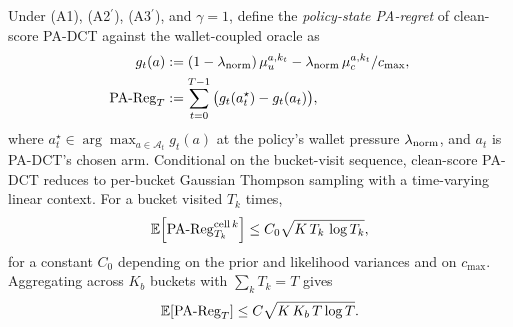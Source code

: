 \begin{theorem}
\label{thm:stationary-regret}
Under (A1), (A2$^\prime$), (A3$^\prime$), and $\gamma=1$, define the
\emph{policy-state PA-regret} of clean-score PA-DCT against the wallet-coupled
oracle as
\begin{equation}
\label{eq:policy-state-regret}
\begin{aligned}
g_t(a) &:=
(1-\lambda_{\mathrm{norm}})\,\mu_u^{a,k_t}
- \lambda_{\mathrm{norm}}\,\mu_c^{a,k_t}/c_{\max},\\
\mathrm{PA\text{-}Reg}_T &:= \sum_{t=0}^{T-1}\big(g_t(a^\star_t)-g_t(a_t)\big),
\end{aligned}
\end{equation}
where $a^\star_t\in\arg\max_{a\in\mathcal{A}_t}g_t(a)$ at the policy's wallet
pressure $\lambda_{\mathrm{norm}}$, and $a_t$ is PA-DCT's chosen arm. Conditional on the
bucket-visit sequence, clean-score PA-DCT reduces to per-bucket Gaussian
Thompson sampling with a time-varying linear context. For a bucket visited
$T_k$ times,
\begin{equation}
\label{eq:cell-regret}
\mathbb{E}\!\left[\mathrm{PA\text{-}Reg}^{\mathrm{cell}\,k}_{T_k}\right]
\leq C_0\sqrt{K\,T_k\,\log T_k},
\end{equation}
for a constant $C_0$ depending on the prior and likelihood variances and on
$c_{\max}$. Aggregating across $K_b$ buckets with $\sum_kT_k=T$ gives
\begin{equation}
\label{eq:stationary-regret}
\mathbb{E}\!\left[\mathrm{PA\text{-}Reg}_T\right]\leq C\sqrt{K\,K_b\,T\log T}.
\end{equation}
\end{theorem}

